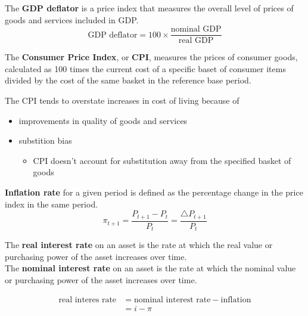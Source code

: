 \documentclass[letterpaper, 9pt,landscape]{extarticle}
\begin{document}
\begin{multicols*}{5}
\begin{definition}
    The \textbf{GDP deflator} is a price index that measures the overall level of prices of goods and services included in GDP. 
    \[
        \text{GDP deflator} = 100 \times \frac{ \text{nominal GDP}}{ \text{real GDP}}
    \]
\end{definition}


\begin{definition}
    The \textbf{Consumer Price Index}, or \textbf{CPI}, measures the prices of consumer goods, calculated as 100 times the current cost of a specific baset of consumer items divided by the cost of the same basket in the reference base period.
\end{definition}

\begin{remark}
    The CPI tends to overstate increases in cost of living because of
    \begin{itemize}
        \item improvements in quality of goods and services
        \item substition bias
        \begin{itemize}
            \item CPI doesn't account for substitution away from the specified basket of goods
        \end{itemize} 
    \end{itemize} 
\end{remark}

\begin{definition}
    \textbf{Inflation rate} for a given period is defined as the percentage change in the price index in the same period.
    \[
        \pi_{t + 1} = \frac{P_{t + 1} - P_t}{P_t} = \frac{\triangle P_{t+1}}{P_t}
    \]
\end{definition}

\begin{definition}
    The \textbf{real interest rate} on an asset is the rate at which the real value or purchasing power of the asset increases over time. \\


    The \textbf{nominal interest rate} on an asset is the rate at which the nominal value or purchasing power of the asset increases over time.

    \begin{align*}
    \text{real interes rate} &= \text{nominal interest rate} - \text{inflation} \\
    &= i - \pi
    \end{align*}
\end{definition}


\end{multicols*}
\end{document}
